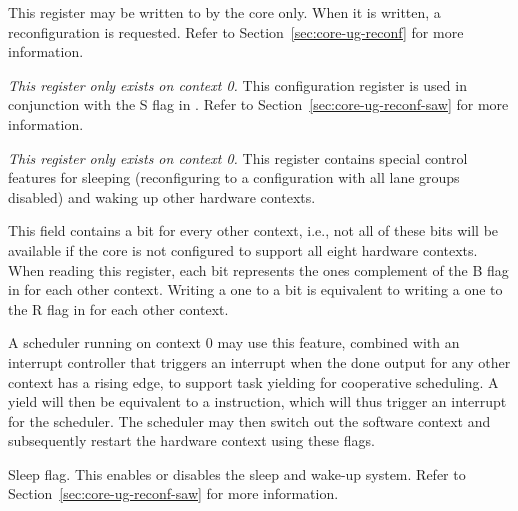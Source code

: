 

This register may be written to by the core only. When it is written, a
reconfiguration is requested. Refer to Section~\ref{sec:core-ug-reconf} for more
information.

\coreCanWrite{}



\emph{This register only exists on context 0.} This configuration register is 
used in conjunction with the S flag in . Refer to
Section~\ref{sec:core-ug-reconf-saw} for more information.

\coreCanWrite{}
\debugCanWrite{}


\emph{This register only exists on context 0.} This register contains special 
control features for sleeping (reconfiguring to a configuration with all lane 
groups disabled) and waking up other hardware contexts.

\debugCanWrite{}
\coreCanWrite{}
This field contains a bit for every other context, i.e., not all of these bits
will be available if the core is not configured to support all eight hardware
contexts. When reading this register, each bit represents the ones complement
of the B flag in  for each other context. Writing a one to a bit is
equivalent to writing a one to the R flag in  for each other context.

A scheduler running on context 0 may use this feature, combined with an
interrupt controller that triggers an interrupt when the done output for any
other context has a rising edge, to support task yielding for cooperative
scheduling. A yield will then be equivalent to a  instruction, which
will thus trigger an interrupt for the scheduler. The scheduler may then
switch out the software context and subsequently restart the hardware context
using these flags.

\debugCanWrite{}
\coreCanWrite{}
Sleep flag. This enables or disables the sleep and wake-up system. Refer to
Section~\ref{sec:core-ug-reconf-saw} for more information.

